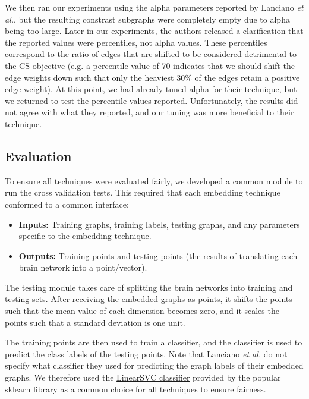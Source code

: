 \documentclass[sigconf]{acmart}
\begin{document}
We then ran our experiments using the alpha parameters reported by Lanciano \emph{et al.}, but the resulting constrast subgraphs were completely empty due to alpha being too large.
Later in our experiments, the authors released a clarification that the reported values were percentiles, not alpha values.
These percentiles correspond to the ratio of edges that are shifted to be considered detrimental to the CS objective (e.g. a percentile value of 70 indicates that we should shift the edge weights down such that only the heaviest 30\% of the edges retain a positive edge weight).
At this point, we had already tuned alpha for their technique, but we returned to test the percentile values reported.
Unfortunately, the results did not agree with what they reported, and our tuning was more beneficial to their technique.

\subsection{Evaluation} \label{evaluation}

To ensure all techniques were evaluated fairly, we developed a common module to run the cross validation tests.
This required that each embedding technique conformed to a common interface:

\begin{itemize}
    \item \textbf{Inputs:} Training graphs, training labels, testing graphs, and any parameters specific to the embedding technique.
    \item \textbf{Outputs:} Training points and testing points (the results of translating each brain network into a point/vector).
\end{itemize}

The testing module takes care of splitting the brain networks into training and testing sets.
After receiving the embedded graphs as points, it shifts the points such that the mean value of each dimension becomes zero, and it scales the points such that a standard deviation is one unit.

The training points are then used to train a classifier, and the classifier is used to predict the class labels of the testing points.
Note that Lanciano \emph{et al.} do not specify what classifier they used for predicting the graph labels of their embedded graphs.
We therefore used the \href{https://scikit-learn.org/stable/modules/generated/sklearn.svm.LinearSVC.html}{LinearSVC classifier} provided by the popular sklearn library as a common choice for all techniques to ensure fairness.
\end{document}
